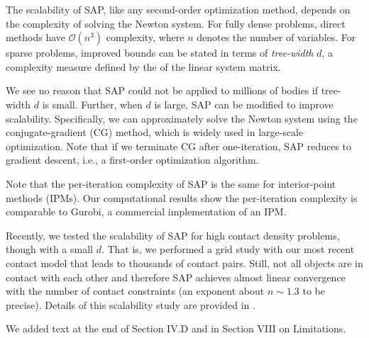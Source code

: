 The scalability of SAP, like any second-order optimization method, depends on
the complexity of solving the Newton system. For fully dense problems,
direct methods have $\mathcal{O}(n^3)$ complexity, where $n$
denotes the number of variables.  For sparse problems, improved bounds can be
stated in terms of \emph{tree-width} $d$, a complexity measure defined by the
\cite{chordal-extensions} of the linear system matrix.

We see no reason that SAP could not be applied to millions of bodies if
tree-width $d$ is small.  Further, when $d$ is large, SAP can be modified to improve
scalability.  Specifically, we can approximately solve the Newton system using
the conjugate-gradient (CG) method, which is widely used in large-scale
optimization.  Note that if we terminate CG after one-iteration, SAP reduces to
gradient descent, i.e., a first-order optimization algorithm. 

Note that the  per-iteration complexity of SAP is the same
for interior-point methods (IPMs).  Our computational results show the per-iteration
complexity is comparable to Gurobi, a commercial implementation of an IPM.

Recently, we tested the scalability of SAP for high contact density problems,
though with a small $d$. That is, we performed a grid study with our most recent
contact model that leads to thousands of contact pairs. Still, not all objects
are in contact with each other and therefore SAP achieves almost linear
convergence with the number of contact constraints (an exponent about $n\sim1.3$
to be precise). Details of this scalability study are provided in
\cite{bib:masterjohn2021discrete}.

We added text at the end of Section IV.D and in Section VIII on Limitations.

